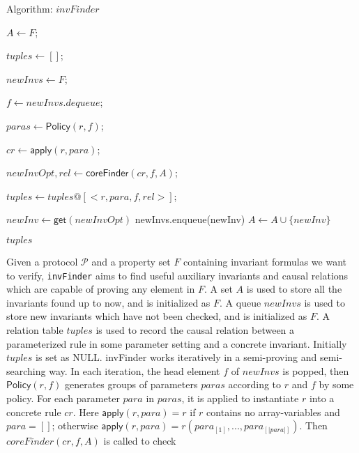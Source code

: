 \documentclass[final]{IEEEtran}
\begin{document}
\begin{algorithm}\label{alg:invFinder}

\caption{Algorithm: $invFinder$}\label{alg:invfinder}



{
    $A\leftarrow F$;

    $tuples \leftarrow []$;

    $newInvs \leftarrow F$;

    {
   $ f \leftarrow newInvs.dequeue$;

   { $paras \leftarrow \mathsf{Policy}(r,f)$;

     {$cr \leftarrow \mathsf{apply}(r,para)$;

       $newInvOpt,rel \leftarrow \mathsf{coreFinder}(cr,  f, A)$;

        $tuples \leftarrow tuples @[<r, para, f, rel>]$;

        {$newInv \leftarrow \mathsf{get}(newInvOpt)$\;
         newInvs.enqueue(newInv)\;
        $A \leftarrow A \cup \{newInv\}$\;
        }

     }
   }
  }
\Return $tuples$\;
}


\end{algorithm}
Given a protocol $\mathcal{P}$ and a property set $F$ containing invariant formulas we want to verify, {\tt invFinder} aims to find useful auxiliary invariants and causal relations which are capable of proving any element in $F$.  A set $A$ is used to store all the invariants found up to now, and is initialized as  $F$. A queue  $newInvs$ is used to store new invariants which have not been checked,  and  is initialized as  $F$.  A relation table $tuples$ is used to record the causal relation between a parameterized rule in some parameter setting and a concrete invariant. Initially $tuples$ is set as NULL.
{\sf invFinder}  works iteratively in a semi-proving and semi-searching way. In each iteration, the head element $f$ of $newInvs$ is popped,  then $\mathsf{Policy}(r,f)$  generates groups of parameters $paras$  according to $r$ and $f$ by some policy. For each parameter $para$ in $paras$,   it is applied to instantiate $r$ into a concrete rule $cr$.  Here  $\mathsf{apply}(r,para)=r$ if $r$ contains no array-variables and $para=[]$; otherwise $\mathsf{apply}(r,para)=r(para_{[1]},..., para_{[|para|]})$. Then $coreFinder(cr,  f, A)$ is called to check
\end{document}
